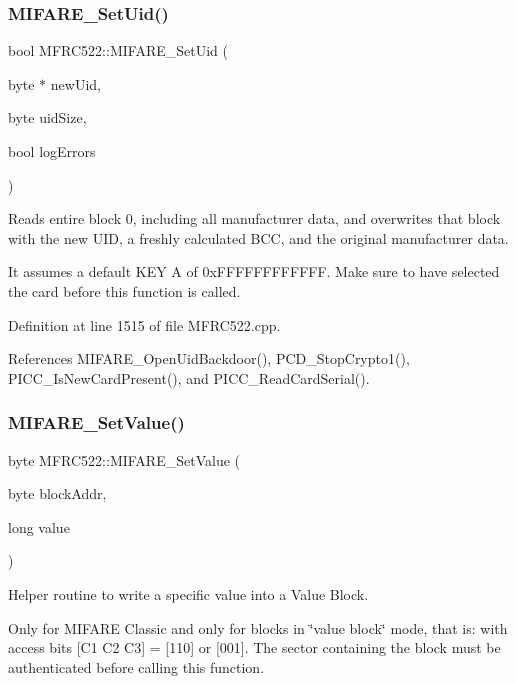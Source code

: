 \subsubsection{\texorpdfstring{M\+I\+F\+A\+R\+E\+\_\+\+Set\+Uid()}{MIFARE\_SetUid()}}
{\footnotesize\ttfamily bool M\+F\+R\+C522\+::\+M\+I\+F\+A\+R\+E\+\_\+\+Set\+Uid (\begin{DoxyParamCaption}\item[{byte $\ast$}]{new\+Uid,  }\item[{byte}]{uid\+Size,  }\item[{bool}]{log\+Errors }\end{DoxyParamCaption})}

Reads entire block 0, including all manufacturer data, and overwrites that block with the new U\+ID, a freshly calculated B\+CC, and the original manufacturer data.

It assumes a default K\+EY A of 0x\+F\+F\+F\+F\+F\+F\+F\+F\+F\+F\+FF. Make sure to have selected the card before this function is called. 

Definition at line 1515 of file M\+F\+R\+C522.\+cpp.



References M\+I\+F\+A\+R\+E\+\_\+\+Open\+Uid\+Backdoor(), P\+C\+D\+\_\+\+Stop\+Crypto1(), P\+I\+C\+C\+\_\+\+Is\+New\+Card\+Present(), and P\+I\+C\+C\+\_\+\+Read\+Card\+Serial().

\mbox{\label{class_m_f_r_c522_a9ae3cc71bcfb52455349683d3685a919}} 
\subsubsection{\texorpdfstring{M\+I\+F\+A\+R\+E\+\_\+\+Set\+Value()}{MIFARE\_SetValue()}}
{\footnotesize\ttfamily byte M\+F\+R\+C522\+::\+M\+I\+F\+A\+R\+E\+\_\+\+Set\+Value (\begin{DoxyParamCaption}\item[{byte}]{block\+Addr,  }\item[{long}]{value }\end{DoxyParamCaption})}

Helper routine to write a specific value into a Value Block.

Only for M\+I\+F\+A\+RE Classic and only for blocks in \char`\"{}value block\char`\"{} mode, that is\+: with access bits \mbox{[}C1 C2 C3\mbox{]} = \mbox{[}110\mbox{]} or \mbox{[}001\mbox{]}. The sector containing the block must be authenticated before calling this function.


